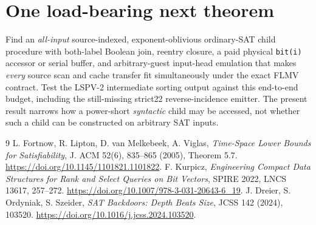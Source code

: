 \documentclass[10pt]{article}
\begin{document}
\section{One load-bearing next theorem}
Find an \emph{all-input} source-indexed, exponent-oblivious ordinary-SAT child procedure with both-label Boolean join, reentry closure, a paid physical \texttt{bit(i)} accessor or serial buffer, and arbitrary-guest input-head emulation that makes \emph{every} source scan and cache transfer fit simultaneously under the exact FLMV contract. Test the LSPV-2 intermediate sorting output against this end-to-end budget, including the still-missing strict22 reverse-incidence emitter. The present result narrows how a power-short \emph{syntactic} child may be accessed, not whether such a child can be constructed on arbitrary SAT inputs.

\begin{thebibliography}{9}
 L. Fortnow, R. Lipton, D. van Melkebeek, A. Viglas, \emph{Time-Space Lower Bounds for Satisfiability}, J. ACM 52(6), 835--865 (2005), Theorem 5.7. \url{https://doi.org/10.1145/1101821.1101822}.
 F. Kurpicz, \emph{Engineering Compact Data Structures for Rank and Select Queries on Bit Vectors}, SPIRE 2022, LNCS 13617, 257--272. \url{https://doi.org/10.1007/978-3-031-20643-6_19}.
 J. Dreier, S. Ordyniak, S. Szeider, \emph{SAT Backdoors: Depth Beats Size}, JCSS 142 (2024), 103520. \url{https://doi.org/10.1016/j.jcss.2024.103520}.
\end{thebibliography}
\end{document}
